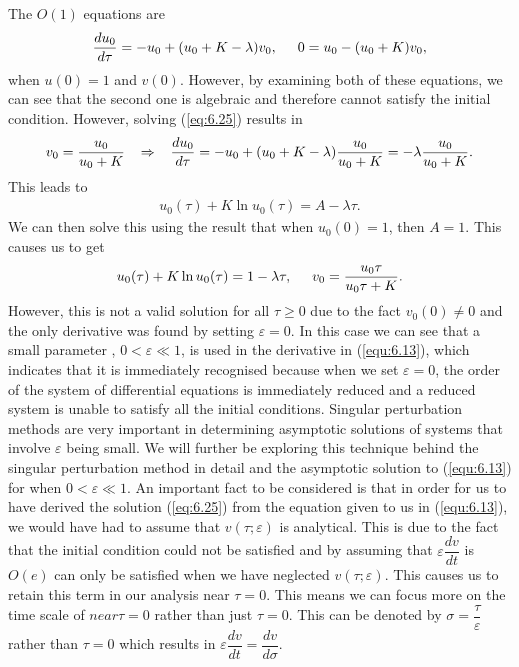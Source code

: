 \documentclass[a4paper]{report}
\theoremstyle{definition}
\begin{document}
The $O(1)$ equations are
\begin{align}\label{eq:6.25}
\dfrac{du_0}{d\tau}= - u_0+(u_0 + K -\lambda)v_0,\hspace{5mm} 
0=u_0 - (u_0+K)v_0,
\end{align}
when $u(0)=1$ and $v(0)$.
However, by examining both of these equations, we can see that the second one is algebraic and therefore cannot satisfy the initial condition. However, solving (\ref{eq:6.25}) results in 
\begin{align}
v_0=\frac{u_0}{u_0+K}\hspace{3mm}\Rightarrow\hspace{3mm}\frac{du_0}{d\tau}=-u_0 + (u_0 +K-\lambda) \frac{u_0}{u_0+K}=-\lambda \frac{u_0}{u_0+K}.
\end{align}
This leads to
\begin{align}
u_0(\tau)+K\ln u_0(\tau)=A-\lambda\tau.
\end{align}
We can then solve this using the result that when $u_0(0)=1$, then $A=1$. This causes us to get 
\begin{align}\label{eq:6.26}
u_0(\tau)+K \ln u_0(\tau)=1-\lambda\tau,\hspace{5mm} v_0=\frac{u_0\tau}{u_0\tau +K}.
\end{align}
However, this is not a valid solution for all $\tau\geq0$ due to the fact $v_0(0)\neq0$ and the only derivative was found by setting $\varepsilon=0$.
In this case we can see that a small parameter , $0<\varepsilon\ll1$, is used in the derivative in (\ref{equ:6.13}), which indicates that it is immediately recognised because when we set $\varepsilon=0$, the order of the system of differential equations is immediately  reduced and a reduced system is unable to satisfy all the initial conditions. Singular perturbation methods are very important in determining asymptotic solutions of systems that involve $\varepsilon$ being small. We will further be exploring this technique behind the singular perturbation method in detail and the asymptotic solution to (\ref{equ:6.13}) for when $0<\varepsilon\ll1$.
An important fact to be considered is that in order for us to have derived the solution (\ref{eq:6.25}) from the equation given to us in (\ref{equ:6.13}), we would have had to assume that $v(\tau;\varepsilon)$ is analytical. This is due to the fact that the initial condition could not be satisfied and by assuming that $\varepsilon\dfrac{dv}{dt}$ is $O(e)$ can only be satisfied when we have neglected $v(\tau;\varepsilon)$. This causes us to retain this term in our analysis near $\tau=0$. This means we can focus more on the time scale of $near  \tau=0$ rather than just $\tau=0$. This can be denoted by $\sigma= \dfrac{\tau}{\varepsilon}$ rather than $\tau=0$ which results in $\varepsilon \dfrac{dv}{dt} = \dfrac{dv}{d\sigma}$. 
\end{document}
